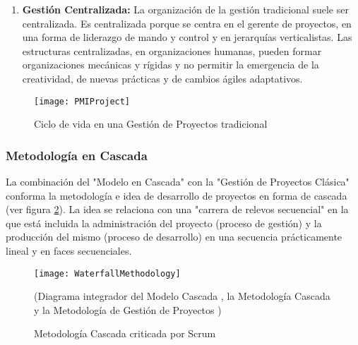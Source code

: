 \begin{enumerate}
\item \textbf{Gestión Centralizada:} La organización de la gestión tradicional suele ser centralizada. Es centralizada porque se centra en el gerente de proyectos, en una forma de liderazgo de mando y control y en jerarquías verticalistas. Las estructuras centralizadas, en organizaciones humanas, pueden formar organizaciones mecánicas y rígidas y no permitir la emergencia de la creatividad, de nuevas prácticas y de cambios ágiles adaptativos.

\end{enumerate}


\begin{figure}[h]
  \centering
  \texttt{[image: PMIProject]}
  \caption{Ciclo de vida en una Gestión de Proyectos tradicional}
  \centering
  \label{fig:PMIProject} %
\end{figure}


\subsubsection{Metodología en Cascada}

La combinación del "Modelo en Cascada" con la "Gestión de Proyectos Clásica" conforma la metodología e idea de desarrollo de proyectos en forma de cascada (ver figura \ref{fig:WaterfallMethodology}). La idea se relaciona con una "carrera de relevos secuencial" en la que está incluida la administración del proyecto (proceso de gestión) y la producción del mismo (proceso de desarrollo) en una secuencia prácticamente lineal y en faces secuenciales.

\begin{figure}[h]
  \centering
  \texttt{[image: WaterfallMethodology]}
  \caption{Metodología Cascada criticada por Scrum}
  (Diagrama integrador del Modelo Cascada \cite{Winston-Royce-1970}, la Metodología Cascada \cite{Ken-Schwaber-1995} y la Metodología de Gestión de Proyectos \cite{PMBOK-1996})
  \centering
  \label{fig:WaterfallMethodology} %
\end{figure}
